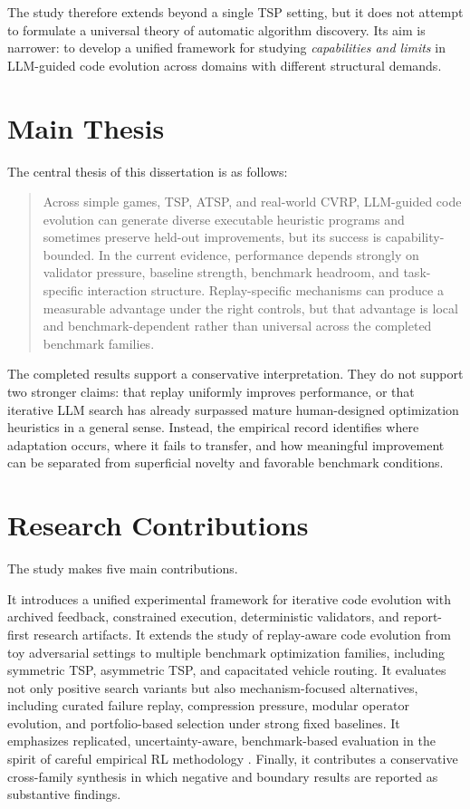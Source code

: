 The study therefore extends beyond a single TSP setting, but it does not attempt to formulate a
universal theory of automatic algorithm discovery. Its aim is narrower: to develop a unified
framework for studying \emph{capabilities and limits} in LLM-guided code evolution across domains
with different structural demands.

\section{Main Thesis}
\label{sec:intro-main-thesis}

The central thesis of this dissertation is as follows:

\begin{quote}
Across simple games, TSP, ATSP, and real-world CVRP, LLM-guided code evolution can generate
diverse executable heuristic programs and sometimes preserve held-out improvements, but its success is
capability-bounded. In the current evidence, performance depends strongly on validator pressure,
baseline strength, benchmark headroom, and task-specific interaction structure. Replay-specific
mechanisms can produce a measurable advantage under the right controls, but that advantage is local and
benchmark-dependent rather than universal across the completed benchmark families.
\end{quote}

The completed results support a conservative interpretation. They do not support two stronger
claims: that replay uniformly improves performance, or that iterative LLM search has already
surpassed mature human-designed optimization heuristics in a general sense. Instead, the empirical
record identifies where adaptation occurs, where it fails to transfer, and how meaningful
improvement can be separated from superficial novelty and favorable benchmark conditions.

\section{Research Contributions}
\label{sec:intro-contributions}

The study makes five main contributions.

It introduces a unified experimental framework for iterative code evolution with archived feedback,
constrained execution, deterministic validators, and report-first research artifacts. It extends
the study of replay-aware code evolution from toy adversarial settings to multiple benchmark
optimization families, including symmetric TSP, asymmetric TSP, and capacitated vehicle routing.
It evaluates not only positive search variants but also mechanism-focused alternatives, including
curated failure replay, compression pressure, modular operator evolution, and portfolio-based
selection under strong fixed baselines. It emphasizes replicated, uncertainty-aware, benchmark-based
evaluation in the spirit of careful empirical RL methodology
\cite{henderson2018drltm,agarwal2021precipice}. Finally, it contributes a conservative
cross-family synthesis in which negative and boundary results are reported as substantive findings.

